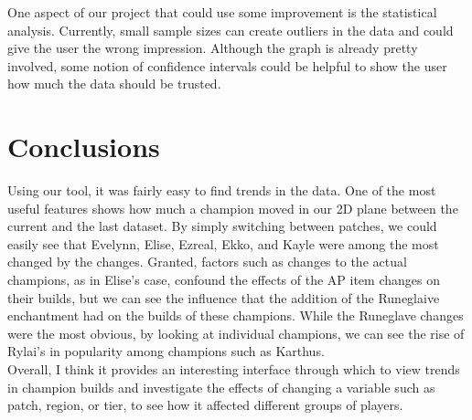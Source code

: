 \documentclass[11pt]{amsart}
\begin{document}
One aspect of our project that could use some improvement is the statistical analysis. Currently, small sample sizes can create outliers in the data and could give the user the wrong impression. Although the graph is already pretty involved, some notion of confidence intervals could be helpful to show the user how much the data should be trusted.\\


\section{Conclusions}

Using our tool, it was fairly easy to find trends in the data. One of the most useful features shows how much a champion moved in our 2D plane between the current and the last dataset. By simply switching between patches, we could easily see that Evelynn, Elise, Ezreal, Ekko, and Kayle were among the most changed by the changes. Granted, factors such as changes to the actual champions, as in Elise's case, confound the effects of the AP item changes on their builds, but we can see the influence that the addition of the Runeglaive enchantment had on the builds of these champions. While the Runeglave changes were the most obvious, by looking at individual champions, we can see the rise of Rylai's in popularity among champions such as Karthus.\\

Overall, I think it provides an interesting interface through which to view trends in champion builds and investigate the effects of changing a variable such as patch, region, or tier, to see how it affected different groups of players.\\
\end{document}
